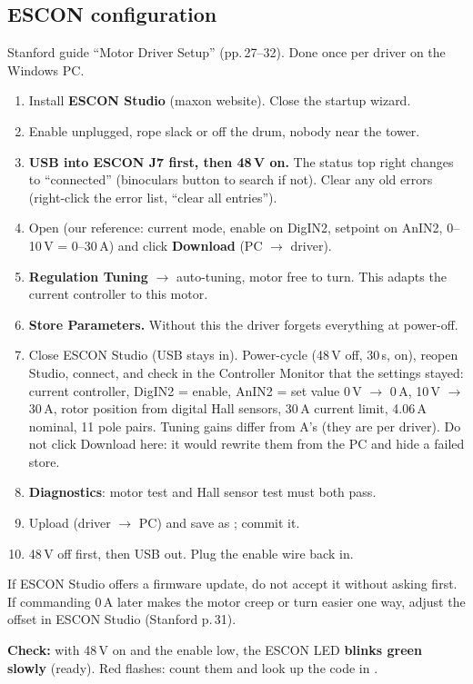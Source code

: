\subsection{ESCON configuration}
Stanford guide ``Motor Driver Setup'' (pp.\,27--32). Done once per driver on the Windows PC.
\begin{enumerate}
\item Install \textbf{ESCON Studio} (maxon website). Close the startup wizard.
\item Enable unplugged, rope slack or off the drum, nobody near the tower.
\item \textbf{USB into ESCON J7 first, then 48\,V on.} The status top right changes to ``connected''
(binoculars button to search if not). Clear any old errors (right-click the error list, ``clear all
entries'').
\item Open  (our reference: current mode, enable on DigIN2,
setpoint on AnIN2, 0--10\,V = 0--30\,A) and click \textbf{Download} (PC $\rightarrow$ driver).
\item \textbf{Regulation Tuning} $\rightarrow$ auto-tuning, motor free to turn. This adapts the current
controller to this motor.
\item \textbf{Store Parameters.} Without this the driver forgets everything at power-off.
\item Close ESCON Studio (USB stays in). Power-cycle (48\,V off, 30\,s, on), reopen Studio, connect, and check in the Controller Monitor that the settings stayed: current controller, DigIN2 = enable, AnIN2 = set value 0\,V $\rightarrow$ 0\,A, 10\,V $\rightarrow$ 30\,A, rotor position from digital Hall sensors, 30\,A current limit, 4.06\,A nominal, 11 pole pairs. Tuning gains differ from A's (they are per driver). Do not click Download here: it would rewrite them from the PC and hide a failed store.
\item \textbf{Diagnostics}: motor test and Hall sensor test must both pass.
\item Upload (driver $\rightarrow$ PC) and save as ; commit it.
\item 48\,V off first, then USB out. Plug the enable wire back in.
\end{enumerate}
If ESCON Studio offers a firmware update, do not accept it without asking first. If commanding 0\,A later
makes the motor creep or turn easier one way, adjust the offset in ESCON Studio (Stanford p.\,31).

\textbf{Check:} with 48\,V on and the enable low, the ESCON LED \textbf{blinks green slowly} (ready).
Red flashes: count them and look up the code in .
